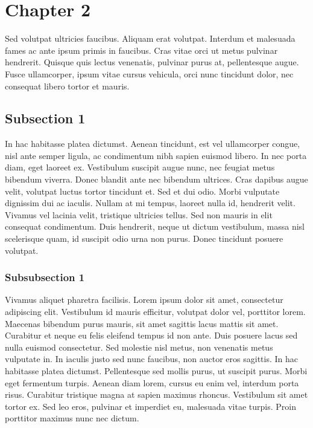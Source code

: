 \section{Chapter 2}

Sed volutpat ultricies faucibus. Aliquam erat volutpat. Interdum et malesuada fames ac ante ipsum primis in faucibus. Cras vitae orci ut metus pulvinar hendrerit. Quisque quis lectus venenatis, pulvinar purus at, pellentesque augue. Fusce ullamcorper, ipsum vitae cursus vehicula, orci nunc tincidunt dolor, nec consequat libero tortor et mauris.

\subsection{Subsection 1}
	In hac habitasse platea dictumst. Aenean tincidunt, est vel ullamcorper congue, nisl ante semper ligula, ac condimentum nibh sapien euismod libero. In nec porta diam, eget laoreet ex. Vestibulum suscipit augue nunc, nec feugiat metus bibendum viverra. Donec blandit ante nec bibendum ultrices. Cras dapibus augue velit, volutpat luctus tortor tincidunt et. Sed et dui odio. Morbi vulputate dignissim dui ac iaculis. Nullam at mi tempus, laoreet nulla id, hendrerit velit. Vivamus vel lacinia velit, tristique ultricies tellus. Sed non mauris in elit consequat condimentum. Duis hendrerit, neque ut dictum vestibulum, massa nisl scelerisque quam, id suscipit odio urna non purus. Donec tincidunt posuere volutpat.

	\subsubsection*{Subsubsection 1}
		Vivamus aliquet pharetra facilisis. Lorem ipsum dolor sit amet, consectetur adipiscing elit. Vestibulum id mauris efficitur, volutpat dolor vel, porttitor lorem. Maecenas bibendum purus mauris, sit amet sagittis lacus mattis sit amet. Curabitur et neque eu felis eleifend tempus id non ante. Duis posuere lacus sed nulla euismod consectetur. Sed molestie nisl metus, non venenatis metus vulputate in. In iaculis justo sed nunc faucibus, non auctor eros sagittis. In hac habitasse platea dictumst. Pellentesque sed mollis purus, ut suscipit purus. Morbi eget fermentum turpis. Aenean diam lorem, cursus eu enim vel, interdum porta risus. Curabitur tristique magna at sapien maximus rhoncus. Vestibulum sit amet tortor ex. Sed leo eros, pulvinar et imperdiet eu, malesuada vitae turpis. Proin porttitor maximus nunc nec dictum.
